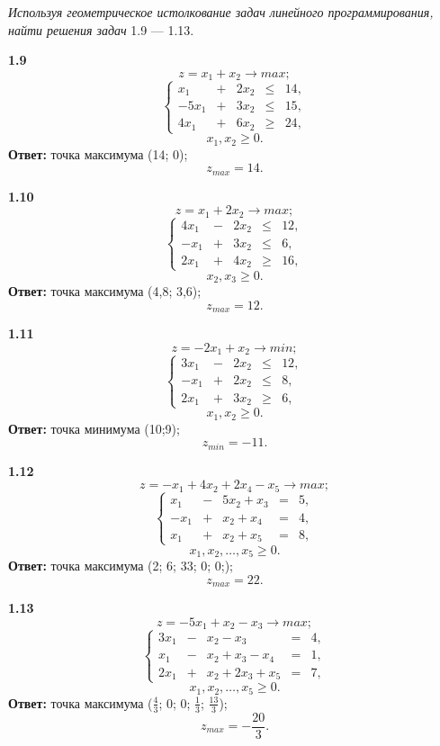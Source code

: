 \documentclass[10pt, a5paper, twoside]{article} %
\begin{document}
\textit{Используя геометрическое истолкование задач линейного программирования, найти решения задач} 1.9 — 1.13.

\begin{minipage}{0.45\textwidth}
 \textbf{1.9}
\[z=x_1 + x_2 \rightarrow max;\]
$$
\left\{
\begin{array}{ccccc}
x_1 &+ &2x_2 &\leq &14, \\
-5x_1 &+ &3x_2 &\leq &15, \\
4x_1 &+ &6x_2 &\geq &24,
\end{array}
\right.
$$
\[x_1, x_2\geq 0.\]
\textbf{Ответ: } точка максимума (14; 0);
\[z_{max} = 14.\]
\end{minipage}
\hfill
\begin{minipage}{0.45\textwidth}
 \textbf{1.10}
\[z=x_1 + 2x_2 \rightarrow max;\]
$$
\left\{
\begin{array}{ccccc}
4x_1 &- &2x_2 &\leq &12, \\
-x_1 &+ &3x_2 &\leq &6, \\
2x_1 &+ &4x_2 &\geq &16,
\end{array}
\right.
$$
\[x_2, x_3\geq 0.\]
\textbf{Ответ: } точка максимума (4,8; 3,6);
\[z_{max} = 12.\]
\end{minipage}

\begin{minipage}{0.45\textwidth}
 \textbf{1.11}
\[z=-2x_1 + x_2 \rightarrow min;\]
$$
\left\{
\begin{array}{ccccc}
3x_1 &- &2x_2 &\leq &12, \\
-x_1 &+ &2x_2 &\leq &8, \\
2x_1 &+ &3x_2 &\geq &6,
\end{array}
\right.
$$
\[x_1, x_2\geq 0.\]
\textbf{Ответ: } точка минимума (10;9);
\[z_{min} = -11.\]
\end{minipage}
\hfill
\begin{minipage}{0.45\textwidth}
 \textbf{1.12}
\[z=-x_1 + 4x_2 +2x_4-x_5 \rightarrow max;\]
$$
\left\{
\begin{array}{ccccc}
x_1 &- &5x_2+x_3 &= &5, \\
-x_1 &+ &x_2+x_4 &= &4, \\
x_1 &+ &x_2+x_5 &= &8,
\end{array}
\right.
$$
\[x_1, x_2, \ldots, x_5 \geq 0.\]
\textbf{Ответ: } точка максимума (2; 6; 33; 0; 0;);
\[z_{max} = 22.\]
\end{minipage}

\begin{minipage}{0.45\textwidth}
 \textbf{1.13}
\[z=-5x_1 + x_2 - x_3\rightarrow max;\]
$$
\left\{
\begin{array}{ccccc}
3x_1 &- &x_2-x_3 &= &4, \\
x_1 &- &x_2+x_3-x_4 &= &1, \\
2x_1 &+ &x_2+2x_3+x_5 &= &7,
\end{array}
\right.
$$
\[x_1, x_2, \ldots, x_5 \geq 0.\]
\textbf{Ответ: } точка максимума ($\frac{4}{3}$; 0; 0; $\frac{1}{3}$; $\frac{13}{3}$);
\[z_{max} = -\frac{20}{3}.\]
\end{minipage}
\vspace{6pt}
\end{document}
